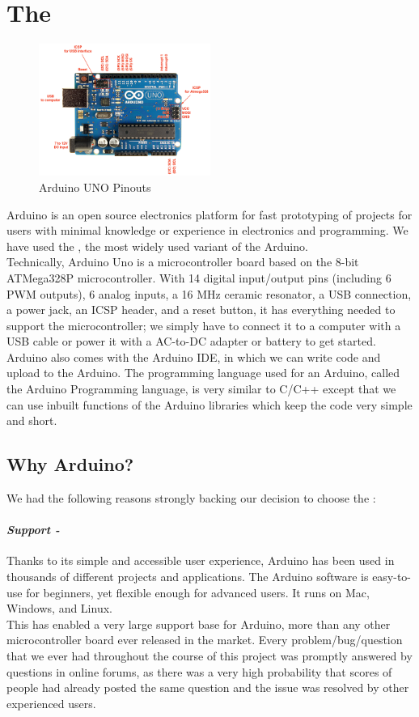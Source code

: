 \section{The \arduinouno}
\begin{figure}[H]
	\centering
	\includegraphics[width=0.5\textwidth]{../Files/ArduinoUno_R3_Pinouts_600}
	\caption{Arduino UNO Pinouts}  \label{fig:Arduino}
\end{figure}
Arduino is an open source electronics platform for fast prototyping of projects for users with minimal knowledge or experience in electronics and programming. We have used the \arduinouno, the most widely used variant of the Arduino.\\
Technically, Arduino Uno is a microcontroller board based on the 8-bit ATMega328P microcontroller. With 14 digital
input/output pins (including 6 PWM outputs), 6 analog inputs, a 16 MHz ceramic resonator, a USB connection, a power jack, an ICSP header, and a reset button, it has everything needed to support the microcontroller; we simply have to connect it to a computer with a USB cable or power it with a AC-to-DC adapter or battery to get started.\\
Arduino also comes with the Arduino IDE, in which we can write code and upload to the Arduino. The programming language used for an Arduino, called the Arduino Programming language, is very similar to C/C++ except that we can use inbuilt functions of the Arduino libraries which keep the code very simple and short.

\subsection{Why Arduino?}
We had the following reasons strongly backing our decision to choose the \arduinouno :
\paragraph{\textit{Support -}}
 Thanks to its simple and accessible user experience, Arduino has been used in thousands of different projects and applications. The Arduino software is easy-to-use for beginners, yet flexible enough for advanced users. It runs on Mac, Windows, and Linux.\\
 This has enabled a very large support base for Arduino, more than any other microcontroller board ever released in the market. Every problem/bug/question that we ever had throughout the course of this project was promptly answered by questions in online forums, as there was a very high probability that scores of people had already posted the same question and the issue was resolved by other experienced users.
